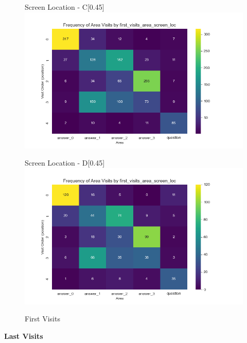 \documentclass{article}
\begin{document}
\begin{figure}[H]
  \begin{subcaptionbox}{Screen Location - C\label{fig:sl_c}}[0.45\textwidth]
    {\centering\includegraphics[width=\linewidth]{plots/visits/matrix_first_visits_first_visits_area_screen_loc_hunters_C (hunters).png}}
  \end{subcaptionbox}
  \hfill
  \begin{subcaptionbox}{Screen Location - D\label{fig:sl_d}}[0.45\textwidth]
    {\centering\includegraphics[width=\linewidth]{plots/visits/matrix_first_visits_first_visits_area_screen_loc_hunters_D (hunters).png}}
  \end{subcaptionbox}
  
  \caption{First Visits}
  \label{fig:fourimages2}
\end{figure}





\newpage
\textbf{Last Visits}
\end{document}
